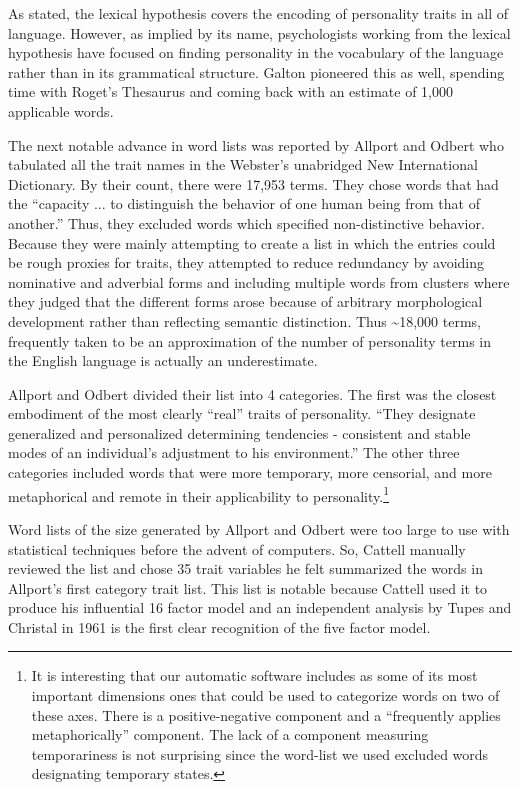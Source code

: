 As stated, the lexical hypothesis covers the encoding of personality traits in
all of language. However, as implied by its name, psychologists working from 
the lexical hypothesis have focused on finding personality in the vocabulary
of the language rather than in its grammatical structure. Galton pioneered this
as well, spending time with Roget's Thesaurus and coming back with an estimate
of 1,000 applicable words.  

The next notable advance in word lists was reported by Allport and Odbert  who tabulated 
all the trait names in the
Webster's unabridged New International Dictionary. By their count, there were
17,953 terms. They chose words that had the ``capacity ... to distinguish 
the behavior of one human being from that of another.'' Thus, they excluded
words which specified non-distinctive behavior. Because they were
mainly attempting to create a list in which the entries could be rough proxies
for traits, they attempted to reduce redundancy by avoiding nominative and
adverbial forms and including multiple words from clusters where they judged 
that the different forms arose because of arbitrary morphological development 
rather than reflecting semantic distinction. Thus \textasciitilde 18,000 terms, frequently taken to 
be an approximation
of the number of personality terms in the English language is actually an
underestimate.

Allport and Odbert divided their list into 4 categories. The first was the
closest embodiment of the most clearly ``real'' traits of personality. ``They
designate generalized and personalized determining tendencies - consistent and
stable modes of an individual's adjustment to his environment.'' The other three
categories included words that were more temporary, more censorial, and more
metaphorical and remote in their applicability to personality.\footnote{ 
It is interesting that our automatic software includes as some of its most 
important dimensions ones that could be used to categorize words on two of these
axes.
There is a positive-negative component and a ``frequently applies metaphorically''
component. The lack of a component measuring temporariness is not surprising
since the word-list we used excluded words designating temporary states.}

Word lists of the size generated by Allport and Odbert were too large to use 
with statistical techniques before the advent of computers. So, Cattell  manually reviewed the list and chose 35 trait variables he felt
summarized the words in Allport's first category trait list. This list is
notable because Cattell used it to produce his influential 16 factor model
and an independent analysis by Tupes and Christal in 1961  is the first clear recognition of the five factor 
model.

